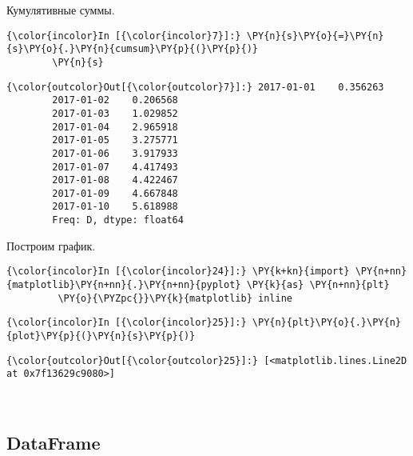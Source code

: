     Кумулятивные суммы.

    \begin{Verbatim}[commandchars=\\\{\}]
{\color{incolor}In [{\color{incolor}7}]:} \PY{n}{s}\PY{o}{=}\PY{n}{s}\PY{o}{.}\PY{n}{cumsum}\PY{p}{(}\PY{p}{)}
        \PY{n}{s}
\end{Verbatim}

            \begin{Verbatim}[commandchars=\\\{\}]
{\color{outcolor}Out[{\color{outcolor}7}]:} 2017-01-01    0.356263
        2017-01-02    0.206568
        2017-01-03    1.029852
        2017-01-04    2.965918
        2017-01-05    3.275771
        2017-01-06    3.917933
        2017-01-07    4.417493
        2017-01-08    4.422467
        2017-01-09    4.667848
        2017-01-10    5.618988
        Freq: D, dtype: float64
\end{Verbatim}
        
    Построим график.

    \begin{Verbatim}[commandchars=\\\{\}]
{\color{incolor}In [{\color{incolor}24}]:} \PY{k+kn}{import} \PY{n+nn}{matplotlib}\PY{n+nn}{.}\PY{n+nn}{pyplot} \PY{k}{as} \PY{n+nn}{plt}
         \PY{o}{\PYZpc{}}\PY{k}{matplotlib} inline
\end{Verbatim}

    \begin{Verbatim}[commandchars=\\\{\}]
{\color{incolor}In [{\color{incolor}25}]:} \PY{n}{plt}\PY{o}{.}\PY{n}{plot}\PY{p}{(}\PY{n}{s}\PY{p}{)}
\end{Verbatim}

            \begin{Verbatim}[commandchars=\\\{\}]
{\color{outcolor}Out[{\color{outcolor}25}]:} [<matplotlib.lines.Line2D at 0x7f13629c9080>]
\end{Verbatim}
        
    \begin{center}
    \end{center}
    { \hspace*{\fill} \\}
    
\subsection{DataFrame}
\label{pandas2}

